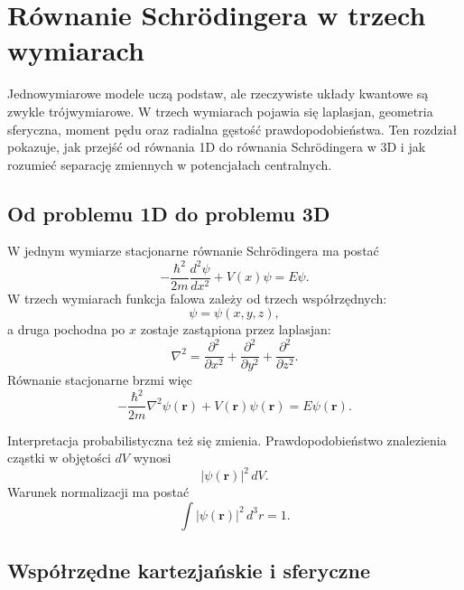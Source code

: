 \chapter{Równanie Schrödingera w trzech wymiarach}

\begin{summarybox}
Jednowymiarowe modele uczą podstaw, ale rzeczywiste układy kwantowe są zwykle
trójwymiarowe. W trzech wymiarach pojawia się laplasjan, geometria sferyczna,
moment pędu oraz radialna gęstość prawdopodobieństwa. Ten rozdział pokazuje, jak
przejść od równania 1D do równania Schrödingera w 3D i jak rozumieć separację
zmiennych w potencjałach centralnych.
\end{summarybox}

\section{Od problemu 1D do problemu 3D}

W jednym wymiarze stacjonarne równanie Schrödingera ma postać
\begin{equation}
    -\frac{\hbar^2}{2m}\frac{d^2\psi}{dx^2}+V(x)\psi=E\psi.
\end{equation}
W trzech wymiarach funkcja falowa zależy od trzech współrzędnych:
\begin{equation}
    \psi=\psi(x,y,z),
\end{equation}
a druga pochodna po \(x\) zostaje zastąpiona przez laplasjan:
\begin{equation}
    \nabla^2=\frac{\partial^2}{\partial x^2}+\frac{\partial^2}{\partial y^2}+\frac{\partial^2}{\partial z^2}.
\end{equation}
Równanie stacjonarne brzmi więc
\begin{equation}
    -\frac{\hbar^2}{2m}\nabla^2\psi(\mathbf{r})+V(\mathbf{r})\psi(\mathbf{r})=E\psi(\mathbf{r}).
\end{equation}

Interpretacja probabilistyczna też się zmienia. Prawdopodobieństwo znalezienia cząstki w objętości \(dV\) wynosi
\begin{equation}
    |\psi(\mathbf{r})|^2\,dV.
\end{equation}
Warunek normalizacji ma postać
\begin{equation}
    \int |\psi(\mathbf{r})|^2\,d^3r=1.
\end{equation}

\section{Współrzędne kartezjańskie i sferyczne}

